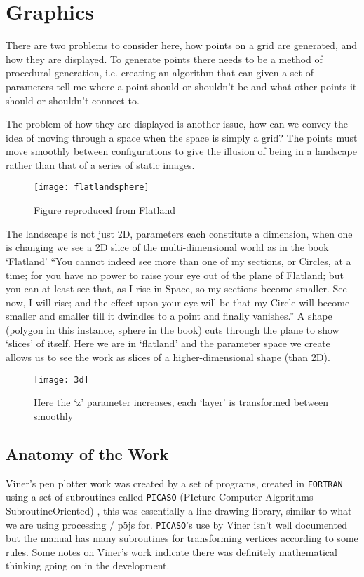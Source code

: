 \chapter{Graphics}

There are two problems to consider here, how points on a grid are generated, and
how they are displayed. To generate points there needs to be a method of
procedural generation, i.e. creating an algorithm that can given a set of
parameters tell me where a point should or shouldn't be and what other points it
should or shouldn't connect to.

The problem of how they are displayed is another issue, how can we convey the
idea of moving through a space when the space is simply a grid? The points must
move smoothly between configurations to give the illusion of being in a
landscape rather than that of a series of static images.

\begin{figure}[H]
    \centering
    \texttt{[image: flatlandsphere]}
    \caption{Figure reproduced from Flatland \citep[p.112]{abbott1885flatland}}
\end{figure}

The landscape is not just 2D, parameters each constitute a dimension, when one is
changing we see a 2D slice of the multi-dimensional world as in the book
`Flatland' ``You cannot indeed see more than one of my sections, or Circles, at
a time; for you have no power to raise your eye out of the plane of Flatland;
but you can at least see that, as I rise in Space, so my sections become
smaller. See now, I will rise; and the effect upon your eye will be that my
Circle will become smaller and smaller till it dwindles to a point and finally
vanishes.'' \citep[p.112]{abbott1885flatland} A shape (polygon in this instance,
sphere in the book) cuts through the plane to show `slices' of itself. Here we
are in `flatland' and the parameter space we create allows us to see the work as
slices of a higher-dimensional shape (than 2D). 

\begin{figure}[H]
    \centering
    \texttt{[image: 3d]}
    \caption{Here the `z' parameter increases, each `layer' is transformed
    between smoothly}
\end{figure}

\section{Anatomy of the Work}
Viner's pen plotter work was created by a set of programs, created in
\verb|FORTRAN| using a set of subroutines called \verb|PICASO| (PIcture Computer
Algorithms SubroutineOriented) \citep{lycett_2016}, this was essentially a
line-drawing library, similar to what we are using processing / p5js for.
\verb|PICASO|'s use by Viner isn't well documented but the manual
\citep{picaso_manual} has many subroutines for transforming vertices according
to some rules. Some notes on Viner's work indicate there was definitely
mathematical thinking going on in the development.

